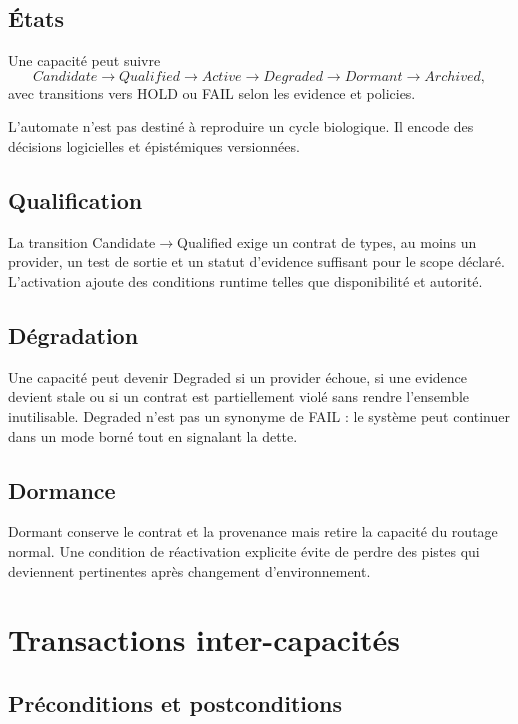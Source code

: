 \section{États}

Une capacité peut suivre
\[
Candidate\to Qualified\to Active\to Degraded\to Dormant\to Archived,
\]
avec transitions vers HOLD ou FAIL selon les evidence et policies.

L'automate n'est pas destiné à reproduire un cycle biologique. Il encode des décisions logicielles et épistémiques versionnées.

\section{Qualification}

La transition Candidate$\to$Qualified exige un contrat de types, au moins un provider, un test de sortie et un statut d'evidence suffisant pour le scope déclaré. L'activation ajoute des conditions runtime telles que disponibilité et autorité.

\section{Dégradation}

Une capacité peut devenir Degraded si un provider échoue, si une evidence devient stale ou si un contrat est partiellement violé sans rendre l'ensemble inutilisable. Degraded n'est pas un synonyme de FAIL : le système peut continuer dans un mode borné tout en signalant la dette.

\section{Dormance}

Dormant conserve le contrat et la provenance mais retire la capacité du routage normal. Une condition de réactivation explicite évite de perdre des pistes qui deviennent pertinentes après changement d'environnement.

\chapter{Transactions inter-capacités}

\section{Préconditions et postconditions}

